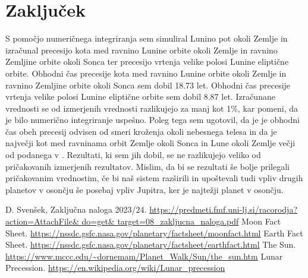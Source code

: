 \documentclass[titlepage,12pt,a4paper]{article}
\begin{document}
\section{Zaključek}
S pomočjo numeričnega integriranja sem simuliral Lunino pot okoli Zemlje in izračunal precesijo kota med ravnino Lunine orbite okoli Zemlje  in ravnino Zemljine orbite okoli Sonca ter precesijo vrtenja velike polosi  Lunine eliptične orbite. Obhodni čas precesije kota med ravnino Lunine orbite okoli Zemlje  in ravnino Zemljine orbite okoli Sonca sem dobil 18.73 let. Obhodni čas precesije vrtenja velike polosi  Lunine eliptične orbite sem dobil 8.87 let. Izračunane vrednosti se od izmerjenih vrednosti razlikujejo za manj kot 1\%, kar pomeni, da je bilo numerično integriranje uspešno. Poleg tega sem ugotovil, da je je obhodni čas obeh precesij odvisen od smeri kroženja okoli nebesnega telesa in da je največji kot med ravninama orbit Zemlje okoli Sonca in Lune okoli Zemlje večji od podanega v \cite{Zak nal}. Rezultati, ki sem jih dobil, se ne razlikujejo veliko od pričakovanih izmerjenih rezultatov. Mislim, da bi se rezultati še bolje prilegali pričakovanim vrednostim, če bi naš sistem razširili in upoštevali tudi vpliv drugih planetov v osončju še posebaj vpliv Jupitra, ker je najtežji planet v osončju.

\begin{thebibliography}{99}

	 D. Svenšek, Zaključna naloga 2023/24. \url{https://predmeti.fmf.uni-lj.si/racorodja?action=AttachFile& do=get& target=08_zakljucna_naloga.pdf}
	 Moon Fact Sheet. \url{https://nssdc.gsfc.nasa.gov/planetary/factsheet/moonfact.html}
	 Earth Fact Sheet. \url{https://nssdc.gsfc.nasa.gov/planetary/factsheet/earthfact.html}
	 The Sun. \url{https://www.mccc.edu/~dornemam/Planet_Walk/Sun/the_sun.htm}
	 Lunar Precession. \url{https://en.wikipedia.org/wiki/Lunar_precession}

\end{thebibliography}
\end{document}
